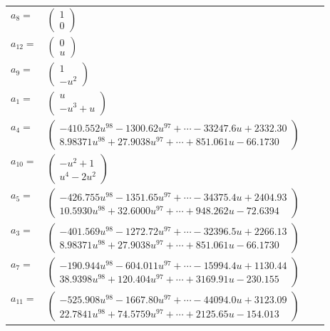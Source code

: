 \documentclass[1p]{elsarticle_modified}
\theoremstyle{definition}
\begin{document}
\begin{tabular}{m{7pt} m{180pt} m{7pt} m{180pt} }
\flushright $a_{8}=$&$\begin{pmatrix}1\\0\end{pmatrix}$ \\
\flushright $a_{12}=$&$\begin{pmatrix}0\\u\end{pmatrix}$ \\
\flushright $a_{9}=$&$\begin{pmatrix}1\\- u^2\end{pmatrix}$ \\
\flushright $a_{1}=$&$\begin{pmatrix}u\\- u^3+u\end{pmatrix}$ \\
\flushright $a_{4}=$&$\begin{pmatrix}-410.552 u^{98}-1300.62 u^{97}+\cdots-33247.6 u+2332.30\\8.98371 u^{98}+27.9038 u^{97}+\cdots+851.061 u-66.1730\end{pmatrix}$ \\
\flushright $a_{10}=$&$\begin{pmatrix}- u^2+1\\u^4-2 u^2\end{pmatrix}$ \\
\flushright $a_{5}=$&$\begin{pmatrix}-426.755 u^{98}-1351.65 u^{97}+\cdots-34375.4 u+2404.93\\10.5930 u^{98}+32.6000 u^{97}+\cdots+948.262 u-72.6394\end{pmatrix}$ \\
\flushright $a_{3}=$&$\begin{pmatrix}-401.569 u^{98}-1272.72 u^{97}+\cdots-32396.5 u+2266.13\\8.98371 u^{98}+27.9038 u^{97}+\cdots+851.061 u-66.1730\end{pmatrix}$ \\
\flushright $a_{7}=$&$\begin{pmatrix}-190.944 u^{98}-604.011 u^{97}+\cdots-15994.4 u+1130.44\\38.9398 u^{98}+120.404 u^{97}+\cdots+3169.91 u-230.155\end{pmatrix}$ \\
\flushright $a_{11}=$&$\begin{pmatrix}-525.908 u^{98}-1667.80 u^{97}+\cdots-44094.0 u+3123.09\\22.7841 u^{98}+74.5759 u^{97}+\cdots+2125.65 u-154.013\end{pmatrix}$ \\

\end{tabular}
\end{document}
